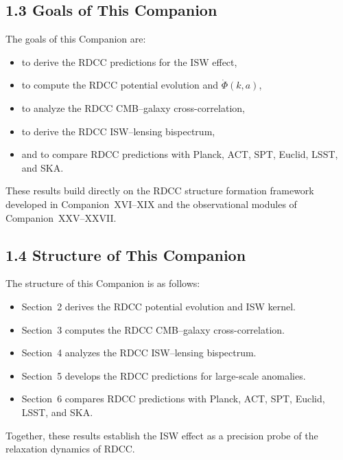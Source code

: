 \documentclass[11pt,a4paper]{article}
\begin{document}
\subsection*{1.3 Goals of This Companion}

The goals of this Companion are:

\begin{itemize}
    \item to derive the RDCC predictions for the ISW effect,
    \item to compute the RDCC potential evolution and $\dot{\Phi}(k,a)$,
    \item to analyze the RDCC CMB–galaxy cross-correlation,
    \item to derive the RDCC ISW–lensing bispectrum,
    \item and to compare RDCC predictions with Planck, ACT, SPT, Euclid, LSST, and SKA.
\end{itemize}

These results build directly on the RDCC structure formation framework developed in 
Companion~XVI–XIX and the observational modules of Companion~XXV–XXVII.

\subsection*{1.4 Structure of This Companion}

The structure of this Companion is as follows:

\begin{itemize}
    \item Section~2 derives the RDCC potential evolution and ISW kernel.
    \item Section~3 computes the RDCC CMB–galaxy cross-correlation.
    \item Section~4 analyzes the RDCC ISW–lensing bispectrum.
    \item Section~5 develops the RDCC predictions for large-scale anomalies.
    \item Section~6 compares RDCC predictions with Planck, ACT, SPT, Euclid, LSST, and SKA.
\end{itemize}

Together, these results establish the ISW effect as a precision probe of the relaxation 
dynamics of RDCC.

\end{document}
